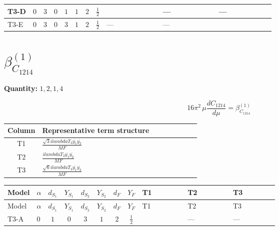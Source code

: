 \documentclass[8pt]{article}
\begin{document}
\begin{landscape}
\begin{longtable}{@{}llcccccc >{\raggedright\arraybackslash}p{0.21\linewidth} >{\raggedright\arraybackslash}p{0.21\linewidth} >{\raggedright\arraybackslash}p{0.21\linewidth}@{}}
\midrule
T3-D & $0$ & $3$ & $0$ & $1$ & $1$ & $2$ & $\frac{1}{2}$ & \scriptsize\adjustbox{max width=\linewidth}{$\begin{gathered} - \frac{\sqrt{3} lambdaT_{3} \overline{y_{1}} \overline{y_{2}}}{3 MF}\end{gathered}$} & --- & --- \\
\midrule
T3-E & $0$ & $3$ & $0$ & $3$ & $1$ & $2$ & $\frac{1}{2}$ & --- & --- & \scriptsize\adjustbox{max width=\linewidth}{$\begin{gathered} \frac{\sqrt{6} lambdaT_{3} \overline{y_{1}} \overline{y_{2}}}{3 MF}\end{gathered}$} \\
\midrule
\bottomrule
\end{longtable}
\clearpage
\section*{$\beta_{C_{1214}}^{(1)}$}
\noindent\textbf{Quantity: }$\mathrm{1,2,1,4}$\par\smallskip
\[16\pi^2\,\mu\frac{d C_{1214}}{d\mu}=\beta_{C_{1214}}^{(1)}\]
\begin{center}
\begin{tabular}{@{}c >{\raggedright\arraybackslash}p{0.82\linewidth}@{}}
\toprule
Column & Representative term structure \\
\midrule
T1 & \(\displaystyle \frac{\sqrt{3} i lambdaT_{3} \overline{y_{1}} \overline{y_{2}}}{MF}\) \\
\midrule
T2 & \(\displaystyle \frac{i lambdaT_{3} \overline{y_{1}} \overline{y_{2}}}{MF}\) \\
\midrule
T3 & \(\displaystyle \frac{\sqrt{6} i lambdaT_{3} \overline{y_{1}} \overline{y_{2}}}{MF}\) \\
\midrule
\bottomrule
\end{tabular}
\end{center}
\smallskip
\tiny
\begin{longtable}{@{}llcccccc >{\raggedright\arraybackslash}p{0.21\linewidth} >{\raggedright\arraybackslash}p{0.21\linewidth} >{\raggedright\arraybackslash}p{0.21\linewidth}@{}}
\toprule
Model & $\alpha$ & $d_{S_1}$ & $Y_{S_1}$ & $d_{S_2}$ & $Y_{S_2}$ & $d_F$ & $Y_F$ & T1 & T2 & T3 \\
\midrule
\endfirsthead
\toprule
Model & $\alpha$ & $d_{S_1}$ & $Y_{S_1}$ & $d_{S_2}$ & $Y_{S_2}$ & $d_F$ & $Y_F$ & T1 & T2 & T3 \\
\midrule
\endhead
T3-A & $0$ & $1$ & $0$ & $3$ & $1$ & $2$ & $\frac{1}{2}$ & \scriptsize\adjustbox{max width=\linewidth}{$\begin{gathered} - \frac{\sqrt{3} i lambdaT_{3} \overline{y_{1}} \overline{y_{2}}}{3 MF}\end{gathered}$} & --- & --- \\

\end{longtable}
\end{landscape}
\end{document}
